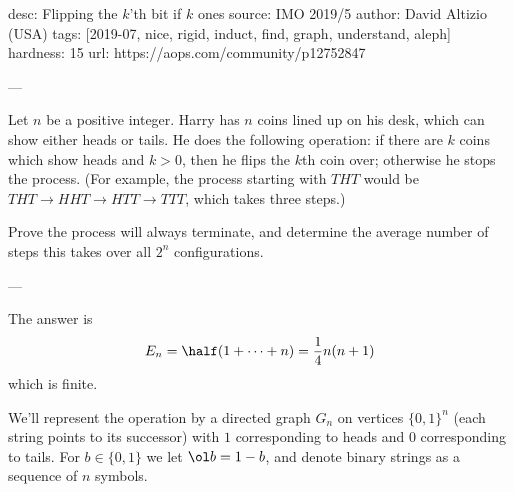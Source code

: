 desc: Flipping the $k$'th bit if $k$ ones
source: IMO 2019/5
author: David Altizio (USA)
tags: [2019-07, nice, rigid, induct, find, graph, understand, aleph]
hardness: 15
url: https://aops.com/community/p12752847

---

Let $n$ be a positive integer.
Harry has $n$ coins lined up on his desk, which can show either heads or tails.
He does the following operation: if there are $k$ coins which show heads and $k > 0$,
then he flips the $k$th coin over; otherwise he stops the process.
(For example, the process starting with $THT$ would be
$THT \to HHT \to HTT \to TTT$, which takes three steps.)

Prove the process will always terminate, and determine the average number of steps
this takes over all $2^n$ configurations.

---

The answer is \[ E_n = \half (1 + \dots + n) = \frac14 n(n+1) \]
which is finite.

We'll represent the operation by a
directed graph $G_n$ on vertices $\{0,1\}^n$
(each string points to its successor)
with $1$ corresponding to heads and $0$ corresponding to tails.
For $b \in \{0,1\}$ we let $\ol b = 1-b$,
and denote binary strings as a sequence of $n$ symbols.

